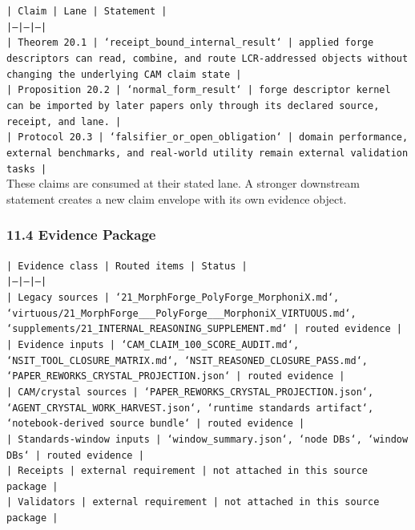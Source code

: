 \documentclass[11pt]{article}
\begin{document}
\noindent\texttt{| Claim | Lane | Statement |}\\
\noindent\texttt{|---|---|---|}\\
\noindent\texttt{| Theorem 20.1 | `receipt\_bound\_internal\_result` | applied forge descriptors can read, combine, and route LCR-addressed objects without changing the underlying CAM claim state |}\\
\noindent\texttt{| Proposition 20.2 | `normal\_form\_result` | forge descriptor kernel can be imported by later papers only through its declared source, receipt, and lane. |}\\
\noindent\texttt{| Protocol 20.3 | `falsifier\_or\_open\_obligation` | domain performance, external benchmarks, and real-world utility remain external validation tasks |}\\

These claims are consumed at their stated lane. A stronger downstream statement
creates a new claim envelope with its own evidence object.

\subsubsection*{11.4 Evidence Package}

\noindent\texttt{| Evidence class | Routed items | Status |}\\
\noindent\texttt{|---|---|---|}\\
\noindent\texttt{| Legacy sources | `21\_MorphForge\_PolyForge\_MorphoniX.md`, `virtuous/21\_MorphForge\_\_\_PolyForge\_\_\_MorphoniX\_VIRTUOUS.md`, `supplements/21\_INTERNAL\_REASONING\_SUPPLEMENT.md` | routed evidence |}\\
\noindent\texttt{| Evidence inputs | `CAM\_CLAIM\_100\_SCORE\_AUDIT.md`, `NSIT\_TOOL\_CLOSURE\_MATRIX.md`, `NSIT\_REASONED\_CLOSURE\_PASS.md`, `PAPER\_REWORKS\_CRYSTAL\_PROJECTION.json` | routed evidence |}\\
\noindent\texttt{| CAM/crystal sources | `PAPER\_REWORKS\_CRYSTAL\_PROJECTION.json`, `AGENT\_CRYSTAL\_WORK\_HARVEST.json`, `runtime standards artifact`, `notebook-derived source bundle` | routed evidence |}\\
\noindent\texttt{| Standards-window inputs | `window\_summary.json`, `node DBs`, `window DBs` | routed evidence |}\\
\noindent\texttt{| Receipts | external requirement | not attached in this source package |}\\
\noindent\texttt{| Validators | external requirement | not attached in this source package |}\\
\end{document}
